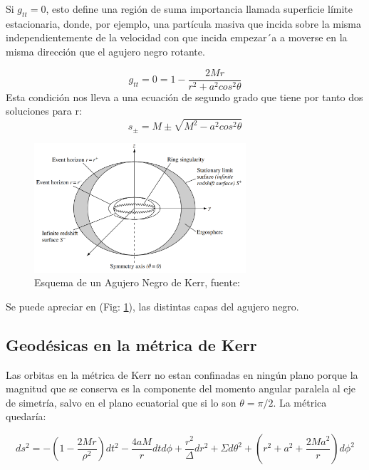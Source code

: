 \documentclass{article}
\begin{document}
Si $g_{tt}=0$, esto define una región de suma importancia llamada superficie límite estacionaria, donde, por ejemplo, una partícula masiva que incida sobre la misma independientemente de la velocidad con que incida empezar´a a moverse en la misma dirección que el agujero negro rotante.\cite{borghiagujeros}

\begin{equation}
    g_{tt}=0=1-\frac{2Mr}{r^{2}+a^{2}cos^2\theta}
\end{equation}
Esta condición nos lleva a una ecuación de segundo grado que tiene por tanto dos soluciones para r:
\begin{equation}
    s_{\pm}=M \pm \sqrt{M^{2}-a^{2}cos^{2}\theta}
\end{equation}

\begin{figure}[H]
    \centering
    \includegraphics[width=0.7\textwidth]{Esquema_ANKerr_Jefferson.png}
    \caption{Esquema de un Agujero Negro de Kerr, fuente: \cite{jeffersonagujeros}}
    \label{fig:Esquema_ANKerr}
\end{figure}

Se puede apreciar en (Fig: \ref{fig:Esquema_ANKerr}), las distintas capas del agujero negro.

\subsection{Geodésicas en la métrica de Kerr}

Las orbitas en la métrica de Kerr no estan confinadas en ningún plano porque la magnitud que se conserva es la componente del momento angular paralela al eje de simetría, salvo en el plano ecuatorial que si lo son $\theta=\pi/2$. La métrica quedaría:\cite{zamorageodesicas}

\begin{equation}\label{Kerr}
    ds^{2}=
    -\left(1-\frac{2Mr}{\rho^{2}}\right)dt^{2} 
    -\frac{4aM}{r}dtd\phi 
    +\frac{r^{2}}{\Delta}dr^{2}
    +\Sigma d\theta^{2} 
    +\left(r^{2}+a^{2}+\frac{2Ma^{2}}{r}\right) d\phi^{2}
\end{equation}
\end{document}
